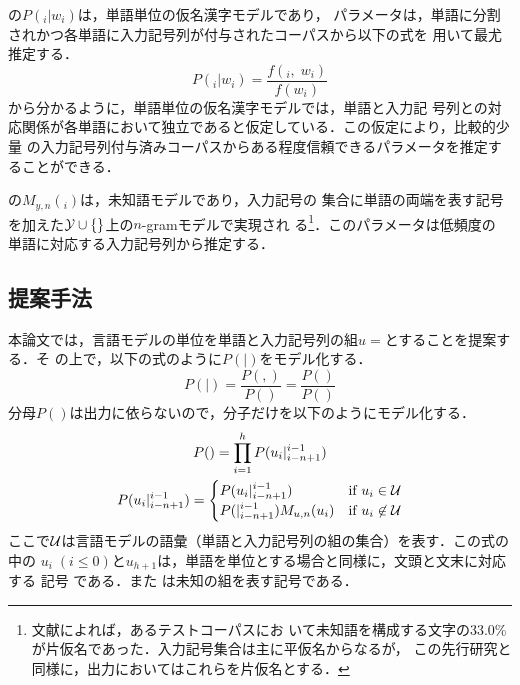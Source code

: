 \documentclass[japanese]{jnlp_JS2.0}
\def\BT{}
\def\Bdma#1{}
\def\equref#1{}
\def\Cite#1{}
\def\UU{}
\def\unit{}
\begin{document}
\equref{eqnarray:KKConv1}の$P(\Bdma{y}_{i}|w_{i})$は，単語単位の仮名漢字モデルであり，
パラメータは，単語に分割されかつ各単語に入力記号列が付与されたコーパスから以下の式を
用いて最尤推定する．
\begin{equation}
  \label{equation:PM}
  P(\Bdma{y}_{i}|w_{i}) = \frac{f(\Bdma{y}_{i},\;w_{i})}{f(w_{i})}
\end{equation}
\equref{eqnarray:KKConv1}から分かるように，単語単位の仮名漢字モデルでは，単語と入力記
号列との対応関係が各単語において独立であると仮定している．この仮定により，比較的少量
の入力記号列付与済みコーパスからある程度信頼できるパラメータを推定することができる．

\equref{eqnarray:KKConv1}の$M_{y,n}(\Bdma{y}_{i})$は，未知語モデルであり，入力記号の
集合に単語の両端を表す記号を加えた${\cal Y} \cup \{\BT\}$上の$n$-gramモデルで実現され
る\footnote{文献\Cite{確率的モデルによる仮名漢字変換}によれば，あるテストコーパスにお
いて未知語を構成する文字の33.0\%が片仮名であった．入力記号集合は主に平仮名からなるが，
この先行研究と同様に，出力においてはこれらを片仮名とする．}．このパラメータは低頻度の
単語に対応する入力記号列から推定する．



\subsection{提案手法}

本論文では，言語モデルの単位を単語と入力記号列の組$u = \unit$とすることを提案する．そ
の上で，以下の式のように$P(\Bdma{w}|\Bdma{y})$をモデル化する．
\[
  P(\Bdma{w}|\Bdma{y}) = \frac{P(\Bdma{w},\Bdma{y})}{P(\Bdma{y})}
                       = \frac{P(\Bdma{u})}{P(\Bdma{y})}
\]
分母$P(\Bdma{y})$は出力に依らないので，分子だけを以下のようにモデル化する．
\begin{gather}
  P(\Bdma{u}) = \prod_{i=1}^{h} P(u_{i}|\Bdma{u}_{i-n+1}^{i-1})
	\nonumber\\
  P(u_{i}|\Bdma{u}_{i-n+1}^{i-1})
   = \begin{cases}
     P(u_{i}|\Bdma{u}_{i-n+1}^{i-1})  & \text{if} \ u_{i} \in {\cal U} \\
     P(\UU|\Bdma{u}_{i-n+1}^{i-1})M_{u,n}(u_{i})
                                      & \text{if} \ u_{i} \not \in {\cal U}
     \end{cases}
  \label{eqnarray:KKConv2}
\end{gather}
ここで${\cal U}$は言語モデルの語彙（単語と入力記号列の組の集合）を表す．この式の中の
$u_{i}\;(i \leq 0)$と$u_{h+1}$は，単語を単位とする場合と同様に，文頭と文末に対応する
記号 \BT である．また \UU は未知の組を表す記号である．
\end{document}
